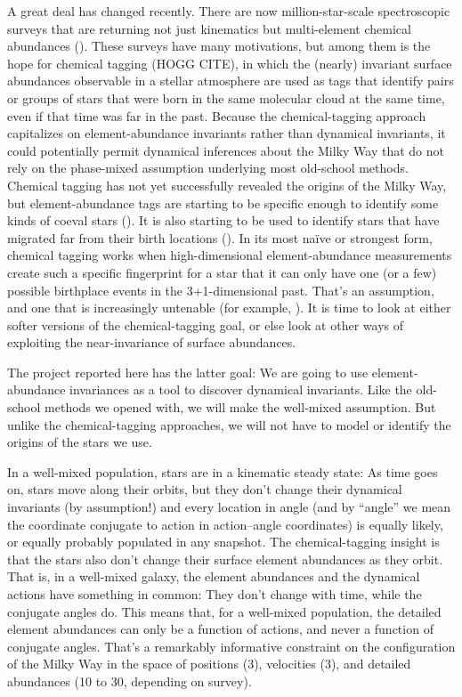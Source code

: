 \documentclass[modern]{aastex62}
\begin{document}
A great deal has changed recently.
There are now million-star-scale spectroscopic surveys that are returning not
just kinematics but multi-element chemical abundances (\citealt{apogee, galah, sdssv}).
These surveys have many motivations, but among them is the hope for
chemical tagging (HOGG CITE), in which the (nearly) invariant surface
abundances observable in a stellar atmosphere are used as tags that identify
pairs or groups of stars that were born in the same molecular cloud at the same time,
even if that time was far in the past.
Because the chemical-tagging approach capitalizes on element-abundance invariants
rather than dynamical invariants, it could potentially permit dynamical inferences
about the Milky Way that do not rely on the phase-mixed assumption underlying
most old-school methods.
Chemical tagging has not yet successfully revealed the origins of
the Milky Way, but element-abundance tags are starting to be specific enough to
identify some kinds of coeval stars (\citealt{tagging}).
It is also starting to be used to identify stars that have
migrated far from their birth locations (\citealt{frankel}).
In its most na\"ive or strongest form, chemical tagging works when high-dimensional
element-abundance measurements create such a specific fingerprint for a star that it
can only have one (or a few) possible birthplace events in the 3+1-dimensional past.
That's an assumption, and one that is increasingly untenable
(for example, \citealt{ting, doppel}).
It is time to look at either softer versions of the chemical-tagging goal, or else
look at other ways of exploiting the near-invariance of surface abundances.

The project reported here has the latter goal:
We are going to use element-abundance invariances as a tool to discover dynamical
invariants.
Like the old-school methods we opened with, we will make the well-mixed assumption.
But unlike the chemical-tagging approaches, we will not have to model or identify
the origins of the stars we use.

In a well-mixed population, stars are in a kinematic steady state:
As time goes on, stars move along their orbits, but they don't change their dynamical
invariants (by assumption!) and every location in angle (and by ``angle'' we mean the
coordinate conjugate to action in action--angle coordinates) is equally likely, or
equally probably populated in any snapshot.
The chemical-tagging insight is that the stars also don't change their surface element
abundances as they orbit.
That is, in a well-mixed galaxy, the element abundances and the dynamical actions have
something in common:
They don't change with time, while the conjugate angles do.
This means that, for a well-mixed population, the detailed element abundances can only
be a function of actions, and never a function of conjugate angles.
That's a remarkably informative constraint on the configuration of the Milky Way in
the space of positions (3), velocities (3), and detailed abundances (10 to 30, depending
on survey).
\end{document}
